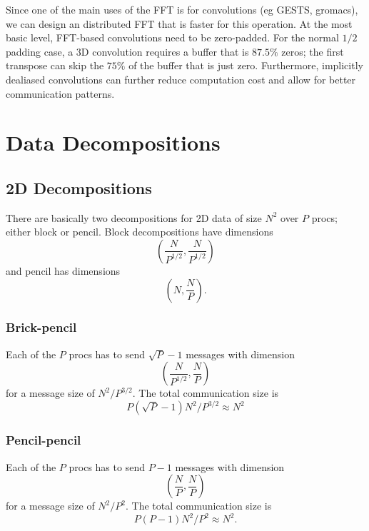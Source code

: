 \documentclass[12pt]{article}
\renewcommand{\(}{\left(}
\renewcommand{\)}{\right)}
\begin{document}
Since one of the main uses of the FFT is for convolutions (eg GESTS,
gromacs), we can design an distributed FFT that is faster for this
operation.  At the most basic level, FFT-based convolutions need to be
zero-padded.  For the normal $1/2$ padding case, a 3D convolution
requires a buffer that is $87.5\%$ zeros; the first transpose can skip
the $75\%$ of the buffer that is just zero.  Furthermore, implicitly
dealiased convolutions can further reduce computation cost and allow
for better communication patterns.



\section{Data Decompositions}
\label{section_data_decomp}


\subsection{2D Decompositions}

There are basically two decompositions for 2D data of size $N^2$ over
$P$ procs; either block or pencil.  Block decompositions have
dimensions
\begin{dmath}
  \label{brick2d}
  \left(\frac{N}{P^{1/2}}, \frac{N}{P^{1/2}} \right)
\end{dmath}
and pencil has dimensions
\begin{dmath}
  \label{pencil2d}
  \left(N, \frac{N}{P} \right).
\end{dmath}

\subsubsection{Brick-pencil}
Each of the $P$ procs has to send $\sqrt{P}-1$ messages with dimension
\begin{dmath}
  \left(\frac{N}{P^{1/2}}, \frac{N}{P} \right)
\end{dmath}
for a message size of $N^2/P^{3/2}$.  The total communication size is
\begin{dmath}
  P \(\sqrt{P}-1\) N^2/P^{3/2} \approx N^2
\end{dmath}

\subsubsection{Pencil-pencil}
Each of the $P$ procs has to send $P-1$ messages with dimension
\begin{dmath}
  \left(\frac{N}{P}, \frac{N}{P} \right)
\end{dmath}
for a message size of $N^2/P^2$.  The total communication size is
\begin{dmath}
  P \(P-1\) N^2/P^2\approx N^2.
\end{dmath}
\end{document}
